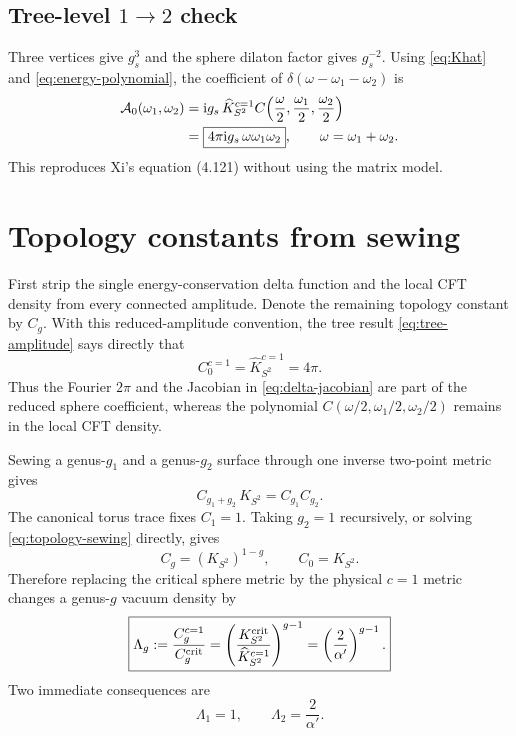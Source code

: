 \documentclass[11pt]{article}
\numberwithin{equation}{section}
\newcommand{\A}{\alpha'}
\newcommand{\ii}{\mathrm i}
\newcommand{\cA}{\mathcal A}
\newcommand{\wh}{\widehat}
\begin{document}
\subsection{Tree-level \texorpdfstring{$1\to2$}{1 to 2} check}

Three vertices give $g_s^3$ and the sphere dilaton factor gives $g_s^{-2}$.
Using \eqref{eq:Khat} and \eqref{eq:energy-polynomial}, the coefficient of
$\delta(\omega-\omega_1-\omega_2)$ is
\begin{align}
 \cA_0(\omega_1,\omega_2)
 &=\ii g_s\,\wh K_{S^2}^{c=1}
 C\!\left(\frac\omega2,\frac{\omega_1}{2},\frac{\omega_2}{2}\right)
 \notag\\
 &=\boxed{4\pi\ii g_s\,\omega\omega_1\omega_2},
 \qquad \omega=\omega_1+\omega_2.
 \label{eq:tree-amplitude}
\end{align}
This reproduces Xi's equation (4.121) without using the matrix model.

\section{Topology constants from sewing}

First strip the single energy-conservation delta function and the local CFT
density from every connected amplitude.  Denote the remaining topology
constant by $C_g$.  With this reduced-amplitude convention, the tree result
\eqref{eq:tree-amplitude} says directly that
\begin{equation}
 C_0^{c=1}=\wh K_{S^2}^{c=1}=4\pi.
 \label{eq:C0-physical}
\end{equation}
Thus the Fourier $2\pi$ and the Jacobian in \eqref{eq:delta-jacobian} are part
of the reduced sphere coefficient, whereas the polynomial
$C(\omega/2,\omega_1/2,\omega_2/2)$ remains in the local CFT density.

Sewing a genus-$g_1$ and a genus-$g_2$ surface through one inverse two-point
metric gives
\begin{equation}
 C_{g_1+g_2}\,K_{S^2}=C_{g_1}C_{g_2}.
 \label{eq:topology-sewing}
\end{equation}
The canonical torus trace fixes $C_1=1$.  Taking $g_2=1$ recursively, or
solving \eqref{eq:topology-sewing} directly, gives
\begin{equation}
C_g=(K_{S^2})^{1-g},\qquad C_0=K_{S^2}.
 \label{eq:Cg}
\end{equation}
Therefore replacing the critical sphere metric by the physical $c=1$ metric
changes a genus-$g$ vacuum density by
\begin{equation}
 \boxed{
 \Lambda_g
 :=\frac{C_g^{c=1}}{C_g^{\rm crit}}
 =\left(\frac{K_{S^2}^{\rm crit}}{\wh K_{S^2}^{c=1}}\right)^{g-1}
 =\left(\frac{2}{\A}\right)^{g-1}.}
 \label{eq:Lambda-g}
\end{equation}
Two immediate consequences are
\begin{equation}
 \boxed{\Lambda_1=1,\qquad \Lambda_2=\frac{2}{\A}.}
 \label{eq:Lambda12}
\end{equation}
\end{document}

